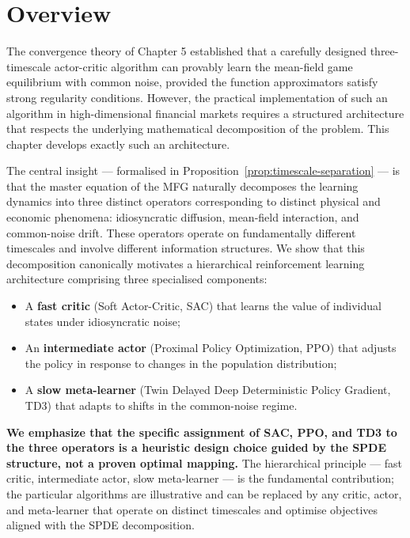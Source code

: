 
\section{Overview}

The convergence theory of Chapter 5 established that a carefully designed
three-timescale actor-critic algorithm can provably learn the mean-field game
equilibrium with common noise, provided the function approximators satisfy strong
regularity conditions. However, the practical implementation of such an algorithm in
high-dimensional financial markets requires a structured architecture that respects
the underlying mathematical decomposition of the problem. This chapter develops
exactly such an architecture.

The central insight --- formalised in Proposition~\ref{prop:timescale-separation} ---
is that the master equation of the MFG naturally decomposes the learning dynamics
into three distinct operators corresponding to distinct physical and economic
phenomena: idiosyncratic diffusion, mean-field interaction, and common-noise drift.
These operators operate on fundamentally different timescales and involve different
information structures. We show that this decomposition canonically motivates a
hierarchical reinforcement learning architecture comprising three specialised
components:

\begin{itemize}
    \item A \textbf{fast critic} (Soft Actor-Critic, SAC) that learns the value of
    individual states under idiosyncratic noise;
    \item An \textbf{intermediate actor} (Proximal Policy Optimization, PPO) that
    adjusts the policy in response to changes in the population distribution;
    \item A \textbf{slow meta-learner} (Twin Delayed Deep Deterministic Policy
    Gradient, TD3) that adapts to shifts in the common-noise regime.
\end{itemize}

\textbf{We emphasize that the specific assignment of SAC, PPO, and TD3 to the three
operators is a heuristic design choice guided by the SPDE structure, not a proven
optimal mapping.} The hierarchical principle --- fast critic, intermediate actor,
slow meta-learner --- is the fundamental contribution; the particular algorithms are
illustrative and can be replaced by any critic, actor, and meta-learner that operate
on distinct timescales and optimise objectives aligned with the SPDE decomposition.

